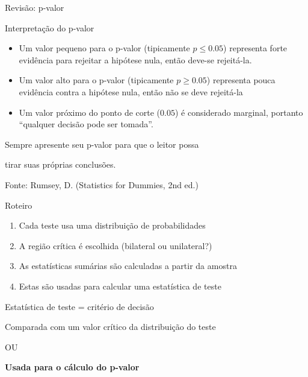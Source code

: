 \documentclass{beamer}
\begin{document}
\begin{frame}{\scriptsize Revisão: p-valor}
\begin{block}{Interpretação do p-valor}
  \begin{itemize}
    \scriptsize
  \item Um valor pequeno para o p-valor (tipicamente $p \le 0.05$)
    representa forte evidência para rejeitar a hipótese nula, então
    deve-se rejeitá-la.
    \medskip
  \item Um valor alto para o p-valor (tipicamente $p \ge 0.05$)
    representa pouca evidência contra a hipótese nula, então não se
    deve rejeitá-la
    \medskip
  \item Um valor próximo do ponto de corte ($0.05$) é considerado
    marginal, portanto ``qualquer decisão pode ser tomada''.
  \end{itemize}
  \begin{block}{}
    \small
    \begin{center}
      Sempre apresente seu p-valor para que o leitor possa

      tirar suas próprias conclusões.
    \end{center}
  \end{block}
\end{block}
\vfill
{\hfill \scriptsize Fonte: Rumsey, D. (Statistics for Dummies, 2nd ed.)}
\end{frame}

\begin{frame}{\scriptsize Roteiro}
  \begin{enumerate}
    \scriptsize
  \item Cada teste usa uma distribuição de probabilidades
    \bigskip
  \item A região crítica é escolhida (bilateral ou unilateral?)
    \bigskip
  \item As estatísticas sumárias são calculadas a partir da amostra
    \bigskip
  \item Estas são usadas para calcular uma {estatística de teste}
    \bigskip
  \end{enumerate}
  \begin{block}{\scriptsize Estatística de teste = critério de decisão}
    \begin{center}
      \footnotesize
      Comparada com um valor crítico da distribuição do teste

      \medskip
      OU

      \medskip
      {\bf Usada para o cálculo do p-valor}
    \end{center}
  \end{block}
\end{frame}
\end{document}
